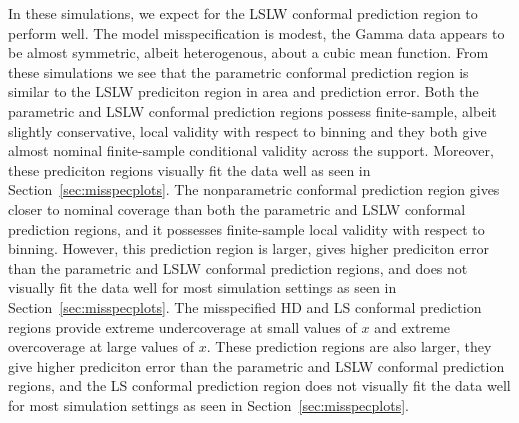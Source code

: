 \documentclass[11pt]{article}\usepackage[]{graphicx}\usepackage[]{color}
\begin{document}
In these simulations, we expect for the LSLW conformal prediction region to 
perform well.  The model misspecification is modest, the Gamma data  
appears to be almost symmetric, albeit heterogenous, about a cubic mean 
function.  From these simulations we see that the parametric conformal 
prediction region is similar to the LSLW prediciton region in area and 
prediction error.  Both the parametric and LSLW conformal 
prediction regions possess finite-sample, albeit slightly conservative, 
local validity with respect to binning and they both give almost nominal 
finite-sample conditional validity across the support.
Moreover, these prediciton regions visually fit the data well as seen in 
Section~\ref{sec:misspecplots}.
The nonparametric conformal prediction region gives closer to nominal 
coverage than both the parametric and LSLW conformal prediction regions, 
and it possesses finite-sample local validity with respect to 
binning.  However, this prediction region is larger, gives higher 
prediciton error than the parametric and LSLW conformal prediction 
regions, and does not visually fit the data well for most simulation settings 
as seen in Section~\ref{sec:misspecplots}.  The misspecified HD and LS 
conformal prediction regions  provide extreme undercoverage at small values 
of $x$ and extreme overcoverage at large values of $x$.  These prediction 
regions are also larger, they give higher prediciton error than the 
parametric and LSLW conformal prediction regions, and the LS conformal 
prediction region does not visually fit the data well for most simulation 
settings as seen in Section~\ref{sec:misspecplots}. 
\end{document}
